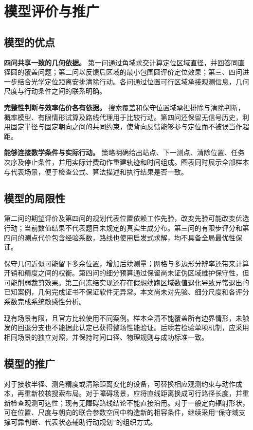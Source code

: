 \documentclass[UTF8,a4paper,zihao=-4,fontset=none]{ctexart}
\begin{document}
\section{模型评价与推广}

\subsection{模型的优点}

\textbf{四问共享一致的几何依据。} 第一问通过角域求交计算定位区域直径，并回答同直径圆的覆盖问题；第二问以反馈后区域的最小包围圆评价定位效果；第三、四问进一步结合光学定位距离安排清除行动。各问通过位置可行区域承接观测信息，几何尺度与行动条件之间的联系明确。

\textbf{完整性判断与效率估价各有依据。} 搜索覆盖和保守位置域承担排除与清除判断，概率模型、有限情形试算及路线代理用于比较行动。第四问还保留无信号历史，利用固定半径与固定朝向之间的共同约束，使背向反馈能够参与定位而不被误当作超距。

\textbf{能够连接数学条件与实际行动。} 策略明确给出站点、下一测点、清除位置、任务次序及停止条件，并用实际计费动作重建轨迹和时间组成。图表同时展示全部样本与代表场景，便于检查公式、算法描述和执行结果是否一致。

\subsection{模型的局限性}

第二问的期望评价及第四问的规划代表位置依赖工作先验，改变先验可能改变优选行动；当前数值结果不代表题目未规定的真实生成分布。第三问的有限步评分和第四问的测点代价包含经验系数，路线也使用启发式求解，均不具备全局最优性保证。

保守几何近似可能留下多余位置，增加后续测量；网格与多边形分辨率还带来计算开销和精度之间的权衡。第四问的细分预算通过保留尚未证伪区域维护保守性，但可能削弱裁剪效果。第三问冻结实现还存在假想续跑区域数值退化导致异常退出的已知案例，几何完成证书不保证软件无异常。本文尚未对先验、细分尺度和各评分系数完成系统敏感性分析。

现有场景有限，且官方比较使用不同案例。样本全清不能覆盖所有边界情形，未触发的回退分支也不能据此认定已获得整场性能验证。后续若检验单项机制，应采用相同场景的独立对照，并保持时间口径、物理规则与成功标准一致。

\subsection{模型的推广}

对于接收半径、测角精度或清除距离变化的设备，可替换相应观测约束与动作成本，再重新校核搜索布局。对于障碍场景，应将直线距离换成可行路径长度，并重新检查观测可达性；现有无障碍路线结论不能直接沿用。对于一般定向辐射形状，可在位置、尺度与朝向的联合参数空间中构造新的相容条件，继续采用“保守域支撑可靠判断、代表状态辅助行动规划”的组织方式。
\end{document}
